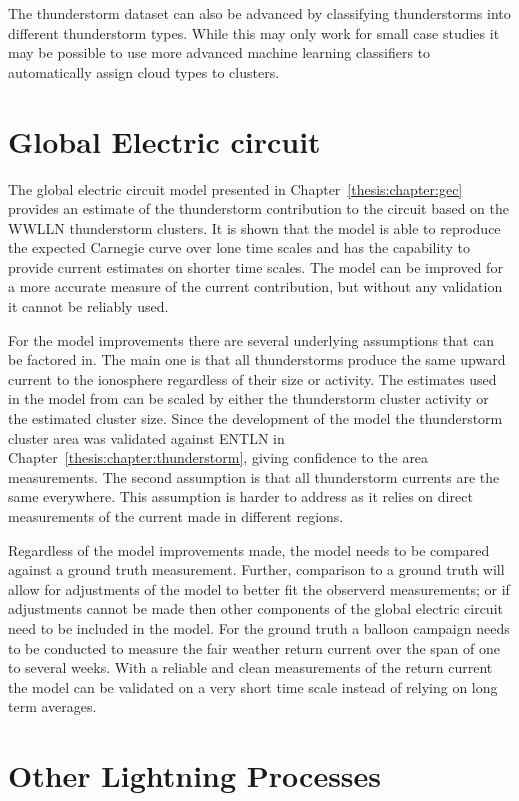 The thunderstorm dataset can also be advanced by classifying thunderstorms into different thunderstorm types.
While this may only work for small case studies it may be possible to use more advanced machine learning classifiers to automatically assign cloud types to clusters.

\section{Global Electric circuit}

The global electric circuit model presented in Chapter~\ref{thesis:chapter:gec} provides an estimate of the thunderstorm contribution to the circuit based on the WWLLN thunderstorm clusters.
It is shown that the model is able to reproduce the expected Carnegie curve over lone time scales and has the capability to provide current estimates on shorter time scales.
The model can be improved for a more accurate measure of the current contribution, but without any validation it cannot be reliably used.

For the model improvements there are several underlying assumptions that can be factored in.
The main one is that all thunderstorms produce the same upward current to the ionosphere regardless of their size or activity.
The estimates used in the model from \citep{Mach2010} can be scaled by either the thunderstorm cluster activity or the estimated cluster size.
Since the development of the model the thunderstorm cluster area was validated against ENTLN in Chapter~\ref{thesis:chapter:thunderstorm}, giving confidence to the area measurements.
The second assumption is that all thunderstorm currents are the same everywhere.
This assumption is harder to address as it relies on direct measurements of the current made in different regions.

Regardless of the model improvements made, the model needs to be compared against a ground truth measurement.
Further, comparison to a ground truth will allow for adjustments of the model to better fit the observerd measurements; or if adjustments cannot be made then other components of the global electric circuit need to be included in the model.
For the ground truth a balloon campaign needs to be conducted to measure the fair weather return current over the span of one to several weeks.
With a reliable and clean measurements of the return current the model can be validated on a very short time scale instead of relying on long term averages.

\section{Other Lightning Processes}

